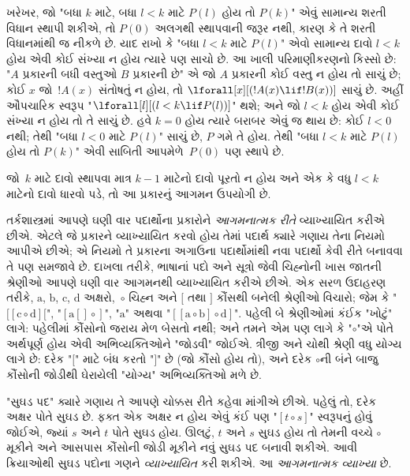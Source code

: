 ખરેખર, જો "બધા $k$ માટે, બધા $l<k$ માટે $P(l)$
હોય તો $P(k)$" એવું સામાન્ય શરતી વિધાન સ્થાપી શકીએ,
તો $P(0)$ અલગથી સ્થાપવાની જરૂર નથી, કારણ કે તે
શરતી વિધાનમાંથી જ નીકળે છે. યાદ રાખો કે "બધા
$l<k$ માટે $P(l)$" એવો સામાન્ય દાવો $l<k$ હોય
એવી કોઈ સંખ્યા ન હોય ત્યારે પણ સાચો છે. આ
ખાલી પરિમાણીકરણનો કિસ્સો છે: "$A$ પ્રકારની
બધી વસ્તુઓ $B$ પ્રકારની છે" એ જો $A$ પ્રકારની
કોઈ વસ્તુ ન હોય તો સાચું છે; કોઈ $x$ જો~$!A(x)$
સંતોષતું ન હોય, તો $\lforall[x][(!A(x) \lif !B(x))]$
સાચું છે. અહીં ઔપચારિક સ્વરૂપ
"$\lforall[l][(l < k \lif P(l))]$" થશે; અને જો
$l < k$ હોય એવી કોઈ સંખ્યા ન હોય તો તે સાચું છે.
હવે $k=0$ હોય ત્યારે બરાબર એવું જ થાય છે:
કોઈ $l<0$ નથી; તેથી "બધા $l<0$ માટે $P(l)$"
સાચું છે, $P$ ગમે તે હોય. તેથી "બધા
$l<k$ માટે $P(l)$ હોય તો $P(k)$" એવી સાબિતી
આપમેળે~$P(0)$ પણ સ્થાપે છે.

જો~$k$ માટે દાવો સ્થાપવા માત્ર $k-1$ માટેનો દાવો
પૂરતો ન હોય અને એક કે વધુ $l<k$ માટેનો દાવો
ધારવો પડે, તો આ પ્રકારનું આગમન ઉપયોગી છે.
\endgroup


\begingroup
\makeatletter{}\makeatother


\label{guunit:OLP-0617}


તર્કશાસ્ત્રમાં આપણે ઘણી વાર પદાર્થોના પ્રકારોને
\emph{આગમનાત્મક રીતે} વ્યાખ્યાયિત કરીએ છીએ. એટલે
જે પ્રકારને વ્યાખ્યાયિત કરવો હોય તેમાં પદાર્થ ક્યારે
ગણાય તેના નિયમો આપીએ છીએ; એ નિયમો તે પ્રકારના
અગાઉના પદાર્થોમાંથી નવા પદાર્થો કેવી રીતે બનાવવા
તે પણ સમજાવે છે. દાખલા તરીકે, ભાષાનાં પદો અને
સૂત્રો જેવી ચિહ્નોની ખાસ જાતની શ્રેણીઓ આપણે
ઘણી વાર આગમનથી વ્યાખ્યાયિત કરીએ છીએ. એક સરળ
ઉદાહરણ તરીકે, $\mathrm{a}$, $\mathrm{b}$, $\mathrm{c}$,
$\mathrm{d}$ અક્ષરો,~$\circ$ ચિહ્ન અને $[$ તથા $]$
કૌંસથી બનેલી શ્રેણીઓ વિચારો; જેમ કે
"$[[\mathrm{c} \circ \mathrm{d}][$",
"$[\mathrm{a}[]\circ]$",
"$\mathrm{a}$" અથવા "$[[\mathrm{a} \circ \mathrm{b}]\circ
\mathrm{d}]$". પહેલી બે શ્રેણીઓમાં કંઈક "ખોટું"
લાગે: પહેલીમાં કૌંસોનો જરાય મેળ બેસતો નથી;
અને તમને એમ પણ લાગે કે "$\circ$"એ પોતે અર્થપૂર્ણ
હોય એવી અભિવ્યક્તિઓને "જોડવી" જોઈએ. ત્રીજી
અને ચોથી શ્રેણી વધુ યોગ્ય લાગે છે: દરેક "$[$"
માટે બંધ કરતો "$]$" છે (જો કૌંસો હોય તો), અને
દરેક $\circ$ની બંને બાજુ કૌંસોની જોડીથી ઘેરાયેલી
"યોગ્ય" અભિવ્યક્તિઓ મળે છે.

"સુઘડ પદ" ક્યારે ગણાય તે આપણે ચોક્કસ રીતે કહેવા
માંગીએ છીએ. પહેલું તો, દરેક અક્ષર પોતે સુઘડ છે.
ફક્ત એક અક્ષર ન હોય એવું કંઈ પણ "$[t \circ s]$"
સ્વરૂપનું હોવું જોઈએ, જ્યાં $s$ અને $t$ પોતે
સુઘડ હોય. ઊલટું, $t$ અને $s$ સુઘડ હોય તો તેમની
વચ્ચે $\circ$ મૂકીને અને આસપાસ કૌંસોની જોડી
મૂકીને નવું સુઘડ પદ બનાવી શકીએ. આવી ક્રિયાઓથી
સુઘડ પદોના ગણને \emph{વ્યાખ્યાયિત} કરી શકીએ.
આ \emph{આગમનાત્મક
  વ્યાખ્યા} છે.

